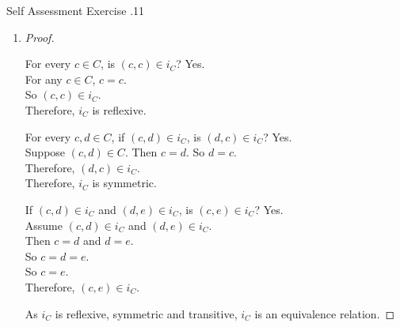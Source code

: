 \documentclass[\main/notes.tex]{subfiles}
\begin{document}
\begin{exercise}{Self Assessment Exercise \thechapter.11}
\begin{enumerate}
\begin{enumerate}
\begin{proof}
									As $i_{C}$ is both injective and surjective, $i_{C}$ is bijective.
								\end{proof}
							\item {}
								\begin{proof}
									\begin{subproof}[Reflexivity]
										For every $c \in C$, is $(c, c) \in i_{C}$? Yes.\\
										For any $c \in C$, $c = c$.\\
										So $(c, c) \in i_{C}$.\\
										Therefore, $i_{C}$ is reflexive.
									\end{subproof}
									\begin{subproof}[Symmetry]
										For every $c, d \in C$, if $(c, d) \in i_{C}$, is $(d, c) \in i_{C}$? Yes.\\
										Suppose $(c, d) \in C$. Then $c = d$. So $d = c$.\\
										Therefore, $(d, c) \in i_{C}$.\\
										Therefore, $i_{C}$ is symmetric.
									\end{subproof}
									\begin{subproof}[Transitivity]
										If $(c, d) \in i_{C}$ and $(d, e) \in i_{C}$, is $(c, e) \in i_{C}$? Yes.\\
										Assume $(c, d) \in i_{C}$ and $(d, e) \in i_{C}$.\\
										Then $c = d$ and $d = e$.\\
										So $c = d = e$.\\
										So $c = e$.\\
										Therefore, $(c, e) \in i_{C}$.
									\end{subproof}
									As $i_{C}$ is reflexive, symmetric and transitive, $i_{C}$ is an equivalence relation.
								\end{proof}
						\end{enumerate}
				\end{enumerate}
			\end{exercise}
\end{document}
